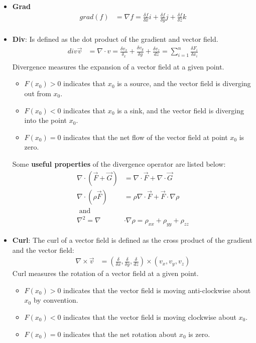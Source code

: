\documentclass{book}
\begin{document}
\begin{itemize}
	\item \textbf{Grad}
	\begin{align*}
		grad(f) &= \nabla f = \frac{\delta f}{\delta x} i + \frac{\delta f}{\delta y} j + \frac{\delta f}{\delta z} k \\
	\end{align*}
	\item \textbf{Div}: Is defined as the dot product of the gradient and vector field.
	\begin{align*}
		div \vec{v} &= \nabla \cdot v = \frac{\delta v_x}{\delta_x} + 	\frac{\delta v_y}{\delta y}+ \frac{\delta v_z}{dz}  = \sum _{i=1}^n \frac{\delta F_i}{\delta x_i}\\
	\end{align*}
	Divergence measures the expansion of a vector field at a given point. 
	\begin{itemize}
		\item $F (x_0) > 0 $ indicates that $x_0$ is a source, and the vector field is diverging out from $x_0$.
		\item $F (x_0) < 0$ indicates that $x_0$ is a sink, and the vector field is diverging into the point $x_0$.
		\item $F (x_0) = 0 $ indicates that the net flow of the vector field at point $x_0$ is zero.
	\end{itemize}
	
	Some \textbf{useful properties} of the divergence operator are listed below:
	\begin{align*}
		\nabla \cdot (\vec{F} + \vec{G}) & = \nabla \cdot \vec{F} + \nabla \cdot \vec{G} \\
		\nabla \cdot (\rho \vec{F}) &= \rho \nabla \cdot \vec{F} + \vec{F} \cdot \nabla \rho \\
		\text{ and}& \\
		\nabla^2 = \nabla & \cdot \nabla \rho = \rho_{xx} + \rho_{yy} + \rho_{zz}
	\end{align*} 
	\item \textbf{Curl}: The curl of a vector field is defined as the cross product of the gradient and the vector field:
	\begin{align*}
		\nabla \times \vec{v} &= (\frac{\delta}{\delta x},\frac{\delta}{\delta y}, \frac{\delta}{dz}) \times (v_x, v_y, v_z)
	\end{align*}
	Curl measures the rotation of a vector field at a given point.
	\begin{itemize}
		\item $F(x_0) > 0$ indicates that the vector field is moving anti-clockwise about $x_0$ by convention.
		\item $F(x_0) < 0$ indicates that the vector field is moving clockwise about $x_0$.
		\item $F(x_0) = 0$ indicates that the net rotation about $x_0$ is zero. 
	\end{itemize}
\end{itemize}
\end{document}
